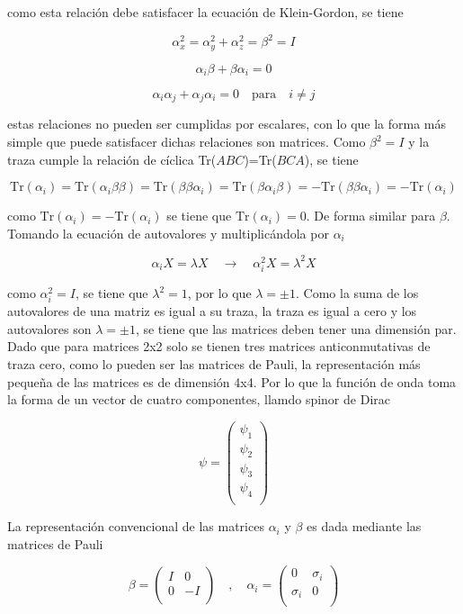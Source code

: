 como esta relación debe satisfacer la ecuación de Klein-Gordon, se tiene

$$ \alpha_x^2 = \alpha_y^2 + \alpha_z^2 = \beta^2 =  I $$

$$ \alpha_i\beta + \beta\alpha_i = 0 $$

$$ \alpha_i\alpha_j + \alpha_j\alpha_i = 0 \quad\text{para}\quad i\neq j $$

estas relaciones no pueden ser cumplidas por escalares, con lo que la forma más simple que puede satisfacer dichas relaciones son matrices. Como $\beta^2=I$ y la traza cumple la relación de cíclica Tr($ABC$)=Tr($BCA$), se tiene

$$ \text{Tr}(\alpha_i) = \text{Tr}(\alpha_i\beta\beta) = \text{Tr}(\beta\beta\alpha_i)=\text{Tr}(\beta\alpha_i\beta) = -\text{Tr}(\beta\beta\alpha_i) = -\text{Tr}(\alpha_i) $$

como $\text{Tr}(\alpha_i)=-\text{Tr}(\alpha_i)$ se tiene que $\text{Tr}(\alpha_i)=0$. De forma similar para $\beta$. Tomando la ecuación de autovalores y multiplicándola por $\alpha_i$

$$ \alpha_i X = \lambda X \quad \rightarrow \quad \alpha_i^2X=\lambda^2X$$

como $\alpha_i^2=I$, se tiene que $\lambda^2=1$, por lo que $\lambda=\pm 1$. Como la suma de los autovalores de una matriz es igual a su traza, la traza es igual a cero y los autovalores son $\lambda=\pm1$, se tiene que las matrices deben tener una dimensión par. Dado que para matrices 2x2 solo se tienen tres matrices anticonmutativas de traza cero, como lo pueden ser las matrices de Pauli, la representación más pequeña de las matrices es de dimensión 4x4. Por lo que la función de onda toma la forma de un vector de cuatro componentes, llamdo spinor de Dirac

$$ \psi = \begin{pmatrix}
    \psi_1 \\
    \psi_2 \\
    \psi_3 \\
    \psi_4 \\
\end{pmatrix} $$

La representación convencional de las matrices $\alpha_i$ y $\beta$ es dada mediante las matrices de Pauli

$$ \beta = \begin{pmatrix}
    I & 0 \\
    0 & -I \\
\end{pmatrix} \quad , \quad \alpha_i = \begin{pmatrix}
    0 & \sigma_i \\
    \sigma_i & 0 \\
\end{pmatrix} $$

